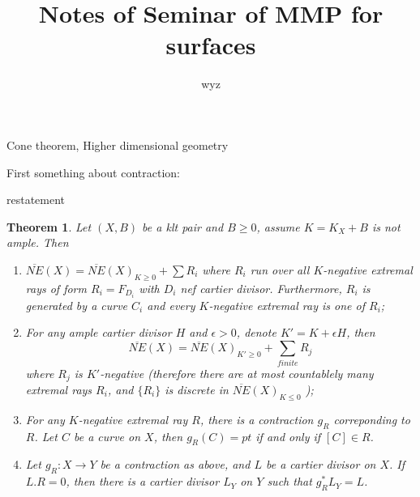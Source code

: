 \documentclass{article}
\title{Notes of Seminar of MMP for surfaces}
\author{wyz}
\date{}
\newtheorem{thm}[defn]{Theorem}
\begin{document}
	 Cone theorem, Higher dimensional geometry

First something about contraction:


restatement
\begin{thm}
	Let $ (X,B) $ be a klt pair and $ B\geqslant 0 $, assume $ K=K_X+B $ is not ample. Then
	\begin{enumerate}[(1)]
		\item $ \overline{NE}(X)=\overline{NE}(X)_{K\geqslant0}+\sum R_i $ where $ R_i $ run over all $ K $-negative extremal rays of form $ R_i=F_{D_i} $ with $ D_i $ nef cartier divisor. Furthermore, $ R_i $ is generated by a curve $ C_i $ and every $ K $-negative extremal ray is one of $ R_i $;
		
		\item For any ample cartier divisor $ H $ and $ \epsilon>0 $, denote $ K'=K+\epsilon H $, then 
		$$  \overline{NE}(X)=\overline{NE}(X)_{K'\geqslant0}+\sum_{finite}R_j  $$
		where $ R_j $ is $ K' $-negative (therefore there are at most countablely many extremal rays $ R_i $, and $ \{R_i\} $ is discrete in  $ \overline{NE}(X)_{K\leqslant0}$ );
		\item For any $ K $-negative extremal ray $ R $, there is a contraction $ g_R $ correponding to $ R $. Let $ C $ be a curve on $ X $, then $ g_R(C)=pt $ if and only if $ [C]\in R $. 
		\item Let $ g_R:X\to Y $ be a contraction as above, and $ L $ be a cartier divisor on $ X $. If $ L.R=0 $, then there is a cartier divisor $ L_Y $ on $ Y $ such that $ g_R^*L_Y=L $.
	
	\end{enumerate}
\end{thm}
\end{document}
